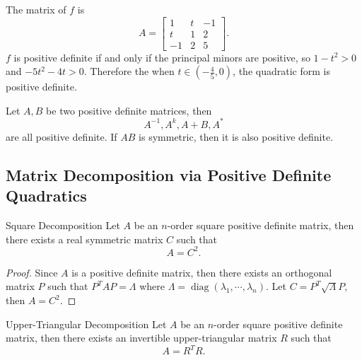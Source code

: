 \begin{solution}
  The matrix of $f$ is 
  \begin{equation}
    A =
    \begin{bmatrix}
      1 & t & -1\\
      t & 1 & 2\\
      -1 & 2 & 5
    \end{bmatrix}.
  \end{equation}
  $f$ is positive definite if and only if the principal minors are positive,
  so $1 - t^2 > 0$ and $-5t^2 - 4t > 0$.
  Therefore the when $t \in (-\frac{4}{5}, 0)$, the quadratic form is positive definite.
\end{solution}

\begin{proposition}{}{}
  Let $A, B$ be two positive definite matrices,
  then
  \begin{equation}
    A^{-1}, A^k, A+B, A^{\ast}
  \end{equation}
  are all positive definite.
  If $AB$ is symmetric, then it is also positive definite.
\end{proposition}

\subsection{Matrix Decomposition via Positive Definite Quadratics}

\begin{proposition}{Square Decomposition}{}
  Let $A$ be an $n$-order square positive definite matrix,
  then there exists a real symmetric matrix $C$ such that
  \begin{equation}
    A = C^2.
  \end{equation}
\end{proposition}

\begin{proof}
  Since $A$ is a positive definite matrix, then there exists an
  orthogonal matrix $P$ such that
  $P^TAP = \Lambda$ where $\Lambda =
  \operatorname{diag}(\lambda_1,\cdots,\lambda_n)$.
  Let $C = P^T \sqrt{\Lambda} P$, then $A = C^2$.
\end{proof}

\begin{proposition}{Upper-Triangular Decomposition}{}
  Let $A$ be an $n$-order square positive definite matrix,
  then there exists an invertible upper-triangular matrix $R$ such that
  \begin{equation}
    A = R^TR.
  \end{equation}
\end{proposition}

